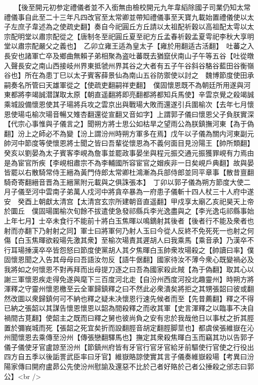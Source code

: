 　　【後至開元初参定禮儀者並不入銜無由檢校開元九年韋縚除國子司業仍知太常禮儀事自此至二十三年凡四改官至太常卿並帶知禮儀事至天寶九載始置禮儀使以太子左庶子韋述為之使疏史翻】奏自今祀圓丘方丘請以太祖配祈穀以高祖配太雩以太宗配明堂以肅宗配從之【唐制冬至祀圓丘夏至祀方丘孟春祈穀孟夏雩祀李秋大享明堂以肅宗配嚴父之義也】　乙卯立雍王适為皇太子【雍於用翻适古活翻】　吐蕃之入長安也諸軍亡卒及鄉曲無賴子弟相聚為盗吐蕃既去猶竄伏南山子午等五谷【吐從暾入聲長安之南山西接岐州界東抵虢州界其谷之大者有五子午谷斜谷駱谷藍田谷衡嶺谷也】所在為患丁巳以太子賓客薛景仙為南山五谷防禦使以討之　魏博節度使田承嗣奏名所管曰天雄軍從之【使疏吏翻嗣祥吏翻】　僕固懷恩既不為朝廷所用遂與河東都將李竭誠潜謀取太原【朝直遥翻將即亮翻都將都知兵馬使】辛雲京覺之殺竭誠乘城設備懷恩使其子瑒將兵攻之雲京出與戰瑒大敗而還遂引兵圍榆次【去年七月懷恩使瑒屯榆次瑒音暢又雉杏翻還從宣翻又音如字】上謂郭子儀曰懷恩父子負朕實深【代宗心事惟與子儀言之】聞朔方將士思公如枯旱之望雨公為朕鎮撫河東【為于偽翻】汾上之師必不為變【汾上謂汾州時朔方軍多在焉】戊午以子儀為關内河東副元帥河中節度等使懷恩將士聞之皆曰吾輩從懷恩為不義何面目見汾陽王【帥所類翻】　癸亥以劉晏為太子賓客李峴為詹事並罷政事晏坐與程元振交通元振獲罪峴有力焉由是為宦官所疾【李峴相肅宗不為李輔國所容宦官之媢疾非一日矣峴戶典翻】故與晏皆罷以右散騎常侍王縉為黃門侍郎太常卿杜鴻漸為兵部侍郎並同平章事【散昔亶翻騎奇寄翻縉音晋為王縉黨附元載與之俱誅張本】　丁卯以郭子儀為朔方節度大使二月子儀至河中雲南子弟萬人戍河中將貪卒暴為一府患子儀斬十四人杖三十人府中遂安　癸酉上朝獻太清宫【太清宫玄宗所建朝音直遥翻】甲戍享太廟乙亥祀昊天上帝於圜丘　僕固瑒圍榆次旬餘不拔遣使急發祁縣兵李光逸盡與之【李光逸屯祁縣事始上年七月】士卒未食行不能前十將白玉焦暉以鳴鏑射其後者【後者行不能及衆者也射而亦翻下乃射射之同】軍士曰將軍何乃射人玉曰今從人反終不免死死一也射之何傷【白玉焦暉欲殺瑒先激其衆】至榆次瑒責其遲胡人曰我乘馬【乘音承】乃漢卒不行耳瑒捶漢卒卒皆怨怒曰節度使黨胡人其夕焦暉白玉帥衆攻瑒殺之【帥讀曰率】僕固懷恩聞之入告其母母曰吾語汝勿反【語牛倨翻】國家待汝不薄今衆心既變禍必及我將如之何懷恩不對再拜而出母提刀逐之曰吾為國家殺此賊【為于偽翻】取其心以謝三軍懷恩疾走得免遂與麾下三百度河北走【自汾州西度河投北趣靈州】時朔方將渾釋之守靈州懷恩檄至云全軍歸鎮釋之曰不然此必衆潰矣將拒之其甥張韶曰彼或翻然改圖以衆歸鎮何可不納也釋之疑未决懷恩行速先候者而至【先昔薦翻】釋之不得已納之張韶以其謀告懷恩懷恩以韶為間殺釋之而收其軍【史言渾釋之以臨事不决自禍間古莧翻】使韶主之既而曰釋之舅也彼尚負之安有忠於我哉他日以事杖之折其脛置於彌峩城而死【張韶之死宜矣折而設翻脛音胡定翻脛脚莖也】都虞侯張維嶽在沁州聞懷恩去乘傳至汾州【傳張戀翻驛馬也】撫定其衆殺焦暉白玉而竊其功以告郭子儀子儀使牙官盧諒至汾州【節鎮州府皆有牙官行官牙官給牙前驅使行官使之行役出四方自五季以後詬詈武臣率曰牙官】維嶽賂諒使實其言子儀奏維嶽殺瑒【考異曰汾陽家傳曰開府盧昴公先使汾州慰諭及還惡不比於己者好賂於己者公捶殺之邠志曰郭公】<br />
